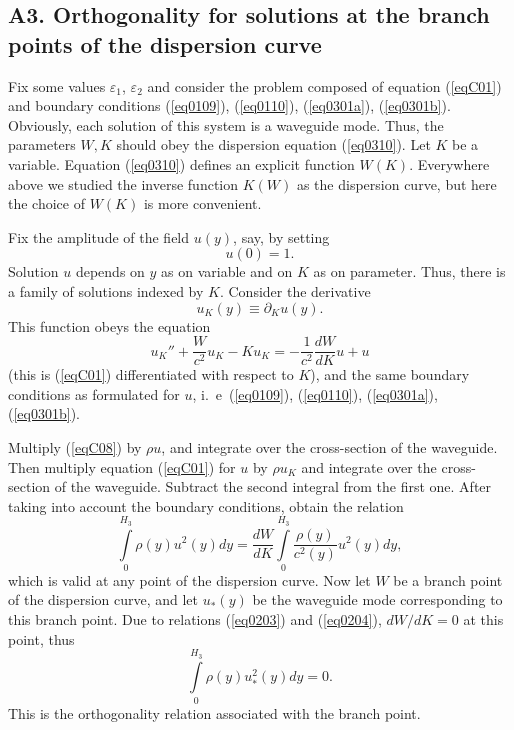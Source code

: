 \documentclass[12pt]{article}
\newcommand{\ptl}{\partial}
\newcommand{\eps}{\varepsilon}
\begin{document}
\subsection*{A3. Orthogonality for solutions at the branch points of the dispersion curve}

Fix some values $\eps_1$, $\eps_2$ and consider the problem composed of equation
(\ref{eqC01}) and boundary conditions (\ref{eq0109}), (\ref{eq0110}), 
(\ref{eq0301a}), (\ref{eq0301b}). Obviously, each solution of this system is a waveguide mode. 
Thus, the parameters $W, K$ should obey the dispersion equation  (\ref{eq0310}). 
Let $K$ be a variable. Equation (\ref{eq0310}) defines an explicit function $W(K)$.
Everywhere above we studied the inverse function $K(W)$ as the dispersion curve, but here the choice of $W(K)$ is more convenient. 

Fix the amplitude of the field $u(y)$, say, by setting 
\[
u(0) = 1. 
\] 
Solution $u$ depends on $y$ as on variable and on $K$ as on parameter. Thus, there 
is a family of solutions indexed by $K$. Consider the derivative 
\[
u_K (y) \equiv \ptl_K u(y). 
\]
This function obeys the equation 
\begin{equation}
u_K'' + \frac{W}{c^2} u_K - K u_K = - \frac{1}{c^2} \frac{d W}{d K} u + u
\label{eqC08}
\end{equation}
(this is (\ref{eqC01}) differentiated with respect to $K$),
and the same boundary conditions as formulated for $u$, i.~e\ (\ref{eq0109}), (\ref{eq0110}), 
(\ref{eq0301a}), (\ref{eq0301b}). 
 
Multiply (\ref{eqC08}) by $\rho u$, and integrate over the cross-section of the waveguide. 
Then multiply equation (\ref{eqC01}) for $u$ by $\rho u_K$ and integrate over the cross-section 
of the waveguide. Subtract the second integral from the first one. After taking into account the boundary conditions, obtain the relation 
\begin{equation}
\int \limits_0^{H_3} \rho(y) u^2(y) dy = 
\frac{d W}{d K}
\int \limits_0^{H_3} \frac{\rho(y)}{c^2(y)} u^2(y) dy, 
\label{eqC09}
\end{equation} 
which is valid at any point of the dispersion curve. 
Now let $W$ be a branch point of the dispersion curve, and let $u_*(y)$ be the waveguide mode
corresponding to this branch point. Due to relations (\ref{eq0203}) and (\ref{eq0204}),
$d W/ d K = 0$ at this point, thus
\begin{equation}
\int \limits_0^{H_3} \rho(y) u_*^2(y) dy = 0. 
\label{eqC10}
\end{equation} 
This is the orthogonality relation associated with the branch point. 
\end{document}
